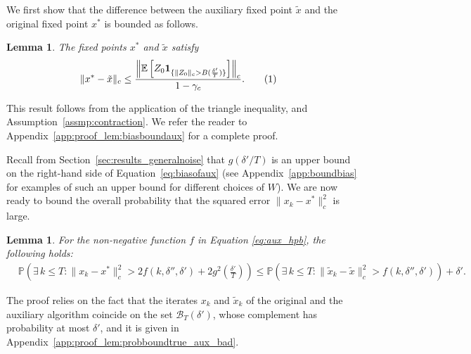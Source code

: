 \documentclass{article}
\newcommand{\numberthis}{\addtocounter{equation}{1}\tag{\theequation}}
\newcommand{\lrp}[1]{\left( #1 \right)}
\newcommand{\lrs}[1]{\left[ #1 \right]}
\newcommand{\E}[1]{\mathbb{E}\lrs{#1}}
\newcommand{\xk}{x_k}
\newtheorem{lemma}[theorem]{Lemma}
\begin{document}
We first show that the difference between the auxiliary fixed point $\tilde{x}$ and the original fixed point $x^*$ is bounded as follows.

\begin{lemma}\label{lem:biasboundaux}
The fixed points $x^*$ and $\tilde{x}$ satisfy 
\begin{align*}
    \|x^* - \tilde{x}\|_c
    &\le \frac{\left\|\E{Z_0 {\bf 1}_{\{\|Z_0\|_c > B(\frac{\delta'}{T})\}}} \right\|_c}{1-\gamma_c}. \numberthis\label{eq:biasofaux} 
\end{align*}
\end{lemma}
This result follows from the application of the triangle inequality, and Assumption~\ref{assmp:contraction}. We refer the reader to Appendix~\ref{app:proof_lem:biasboundaux} for a complete proof.

\medskip


Recall from Section~\ref{sec:results_generalnoise} that $g(\delta'/T)$ is an upper bound on the right-hand side of Equation~\eqref{eq:biasofaux} (see Appendix~\ref{app:boundbias} for examples of such an upper bound for different choices of $W$). We are now ready to bound the overall probability that the squared error $\|\xk-x^*\|^2_c$ is large.

\begin{lemma}\label{lem:probboundtrue_aux_bad}
    For the non-negative function $f$ in Equation \eqref{eq:aux_hpb}, the following holds:
    \begin{align*}
    & \mathbb{P}\lrp{ \exists \, k \leq T : \|x_k - x^*\|^2_c  > 2 f(k, \delta'', \delta') + 2g^2(\tfrac{\delta'}{T}) } \leq 
    \mathbb{P}\lrp{ \exists \, k\leq T : \|\tilde{x}_k - \tilde{x} \|^2_c > f(k, \delta'', \delta')  } + \delta'.
    \end{align*}
\end{lemma}
The proof relies on the fact that the iterates $\xk$ and $\tilde{x}_k$ of the original and the auxiliary algorithm coincide on the set $\mathcal B_T(\delta')$, whose complement has probability at most $\delta'$, and it is given in Appendix~\ref{app:proof_lem:probboundtrue_aux_bad}.

\medskip
\end{document}
